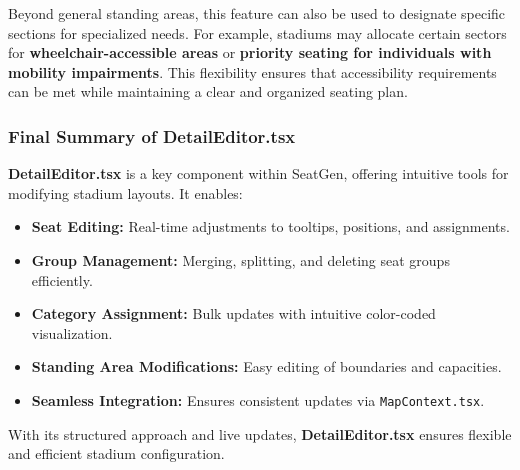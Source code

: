 Beyond general standing areas, this feature can also be used to designate specific sections for specialized needs. For example, stadiums may allocate certain sectors for \textbf{wheelchair-accessible areas} or \textbf{priority seating for individuals with mobility impairments}. This flexibility ensures that accessibility requirements can be met while maintaining a clear and organized seating plan.

\subsubsection{Final Summary of DetailEditor.tsx}
\textbf{DetailEditor.tsx} is a key component within SeatGen, offering intuitive tools for modifying stadium layouts. It enables:
\begin{itemize}
    \item \textbf{Seat Editing:} Real-time adjustments to tooltips, positions, and assignments.
    \item \textbf{Group Management:} Merging, splitting, and deleting seat groups efficiently.
    \item \textbf{Category Assignment:} Bulk updates with intuitive color-coded visualization.
    \item \textbf{Standing Area Modifications:} Easy editing of boundaries and capacities.
    \item \textbf{Seamless Integration:} Ensures consistent updates via \texttt{MapContext.tsx}.
\end{itemize}

With its structured approach and live updates, \textbf{DetailEditor.tsx} ensures flexible and efficient stadium configuration.
